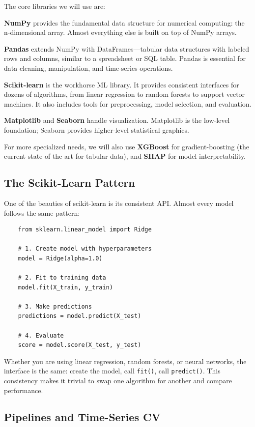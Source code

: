 \documentclass[11pt,a4paper]{article}
\begin{document}
The core libraries we will use are:

\textbf{NumPy} provides the fundamental data structure for numerical computing: the n-dimensional array. Almost everything else is built on top of NumPy arrays.

\textbf{Pandas} extends NumPy with DataFrames---tabular data structures with labeled rows and columns, similar to a spreadsheet or SQL table. Pandas is essential for data cleaning, manipulation, and time-series operations.

\textbf{Scikit-learn} is the workhorse ML library. It provides consistent interfaces for dozens of algorithms, from linear regression to random forests to support vector machines. It also includes tools for preprocessing, model selection, and evaluation.

\textbf{Matplotlib} and \textbf{Seaborn} handle visualization. Matplotlib is the low-level foundation; Seaborn provides higher-level statistical graphics.

For more specialized needs, we will also use \textbf{XGBoost} for gradient-boosting (the current state of the art for tabular data), and \textbf{SHAP} for model interpretability.

\subsection{The Scikit-Learn Pattern}

One of the beauties of scikit-learn is its consistent API. Almost every model follows the same pattern:

\begin{verbatim}
    from sklearn.linear_model import Ridge
    
    # 1. Create model with hyperparameters
    model = Ridge(alpha=1.0)
    
    # 2. Fit to training data
    model.fit(X_train, y_train)
    
    # 3. Make predictions
    predictions = model.predict(X_test)
    
    # 4. Evaluate
    score = model.score(X_test, y_test)
\end{verbatim}

Whether you are using linear regression, random forests, or neural networks, the interface is the same: create the model, call \texttt{fit()}, call \texttt{predict()}. This consistency makes it trivial to swap one algorithm for another and compare performance.

\subsection{Pipelines and Time-Series CV}
\end{document}
